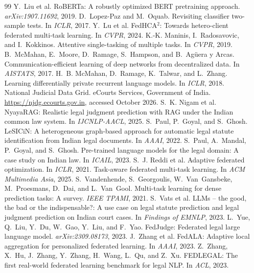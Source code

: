 \documentclass[11pt,a4paper]{article}
\begin{document}
\begin{thebibliography}{99}
 Y.~Liu et al. RoBERTa: A robustly optimized BERT pretraining approach. \emph{arXiv:1907.11692}, 2019.
 D.~Lopez-Paz and M.~Oquab. Revisiting classifier two-sample tests. In \emph{ICLR}, 2017.
 Y.~Lu et al. FedHCA$^2$: Towards hetero-client federated multi-task learning. In \emph{CVPR}, 2024.
 K.-K. Maninis, I.~Radosavovic, and I.~Kokkinos. Attentive single-tasking of multiple tasks. In \emph{CVPR}, 2019.
 B.~McMahan, E.~Moore, D.~Ramage, S.~Hampson, and B.~Ag\"uera y Arcas. Communication-efficient learning of deep networks from decentralized data. In \emph{AISTATS}, 2017.
 H.~B. McMahan, D.~Ramage, K.~Talwar, and L.~Zhang. Learning differentially private recurrent language models. In \emph{ICLR}, 2018.
 National Judicial Data Grid. eCourts Services, Government of India. \url{https://njdg.ecourts.gov.in}, accessed October 2026.
 S.~K. Nigam et al. NyayaRAG: Realistic legal judgment prediction with RAG under the Indian common law system. In \emph{IJCNLP-AACL}, 2025.
 S.~Paul, P.~Goyal, and S.~Ghosh. LeSICiN: A heterogeneous graph-based approach for automatic legal statute identification from Indian legal documents. In \emph{AAAI}, 2022.
 S.~Paul, A.~Mandal, P.~Goyal, and S.~Ghosh. Pre-trained language models for the legal domain: A case study on Indian law. In \emph{ICAIL}, 2023.
 S.~J. Reddi et al. Adaptive federated optimization. In \emph{ICLR}, 2021.
 Task-aware federated multi-task learning. In \emph{ACM Multimedia Asia}, 2025.
 S.~Vandenhende, S.~Georgoulis, W.~Van~Gansbeke, M.~Proesmans, D.~Dai, and L.~Van~Gool. Multi-task learning for dense prediction tasks: A survey. \emph{IEEE TPAMI}, 2021.
 S.~Vats et al. LLMs -- the good, the bad or the indispensable?: A use case on legal statute prediction and legal judgment prediction on Indian court cases. In \emph{Findings of EMNLP}, 2023.
 L.~Yue, Q.~Liu, Y.~Du, W.~Gao, Y.~Liu, and F.~Yao. FedJudge: Federated legal large language model. \emph{arXiv:2309.08173}, 2023.
 J.~Zhang et al. FedALA: Adaptive local aggregation for personalized federated learning. In \emph{AAAI}, 2023.
 Z.~Zhang, X.~Hu, J.~Zhang, Y.~Zhang, H.~Wang, L.~Qu, and Z.~Xu. FEDLEGAL: The first real-world federated learning benchmark for legal NLP. In \emph{ACL}, 2023.
\end{thebibliography}
\end{document}
